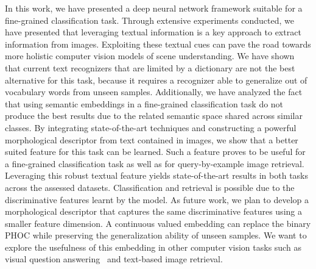\documentclass[10pt,twocolumn,letterpaper]{article}
\begin{document}
In this work, we have presented a deep neural network framework suitable for a fine-grained classification task. 
Through extensive experiments conducted, we have presented that leveraging textual information is a key approach to extract information from images. Exploiting these textual cues can pave the road towards more holistic computer vision models of scene understanding. We have shown that current text recognizers that are limited by a dictionary are not the best alternative for this task, because it requires a recognizer able to generalize out of vocabulary words from unseen samples. 
Additionally, we have analyzed the fact that using semantic embeddings in a fine-grained classification task do not produce the best results due to the related semantic space shared across similar classes. By integrating state-of-the-art techniques and constructing a powerful morphological descriptor from text contained in images, we show that a better suited feature for this task can be learned. Such a feature proves to be useful for a fine-grained classification task as well as for query-by-example image retrieval. Leveraging this robust textual feature yields state-of-the-art results in both tasks across the assessed datasets. Classification and retrieval is possible due to the discriminative features learnt by the model.
As future work, we plan to develop a morphological descriptor that captures the same discriminative features using a smaller feature dimension. A continuous valued embedding can replace the binary PHOC while preserving the generalization ability of unseen samples. We want to explore the usefulness of this embedding in other computer vision tasks such as visual question answering~\cite{biten2019stvqa, singh2019towards} and text-based image retrieval. 


{\small


}
\end{document}
